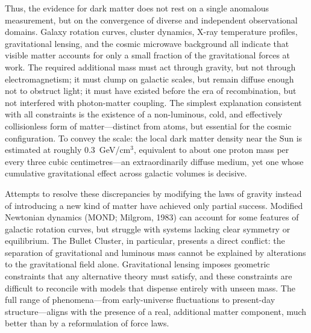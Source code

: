 Thus, the evidence for dark matter does not rest on a single anomalous measurement, but on the convergence of diverse and independent observational domains. Galaxy rotation curves, cluster dynamics, X-ray temperature profiles, gravitational lensing, and the cosmic microwave background all indicate that visible matter accounts for only a small fraction of the gravitational forces at work. The required additional mass must act through gravity, but not through electromagnetism; it must clump on galactic scales, but remain diffuse enough not to obstruct light; it must have existed before the era of recombination, but not interfered with photon-matter coupling. The simplest explanation consistent with all constraints is the existence of a non-luminous, cold, and effectively collisionless form of matter—distinct from atoms, but essential for the cosmic configuration. To convey the scale: the local dark matter density near the Sun is estimated at roughly $0.3$~GeV/cm$^3$, equivalent to about one proton mass per every three cubic centimetres—an extraordinarily diffuse medium, yet one whose cumulative gravitational effect across galactic volumes is decisive.

Attempts to resolve these discrepancies by modifying the laws of gravity instead of introducing a new kind of matter have achieved only partial success. Modified Newtonian dynamics (MOND; Milgrom, 1983) can account for some features of galactic rotation curves, but struggle with systems lacking clear symmetry or equilibrium. The Bullet Cluster, in particular, presents a direct conflict: the separation of gravitational and luminous mass cannot be explained by alterations to the gravitational field alone. Gravitational lensing imposes geometric constraints that any alternative theory must satisfy, and these constraints are difficult to reconcile with models that dispense entirely with unseen mass. The full range of phenomena—from early-universe fluctuations to present-day structure—aligns with the presence of a real, additional matter component, much better than by a reformulation of force laws.




